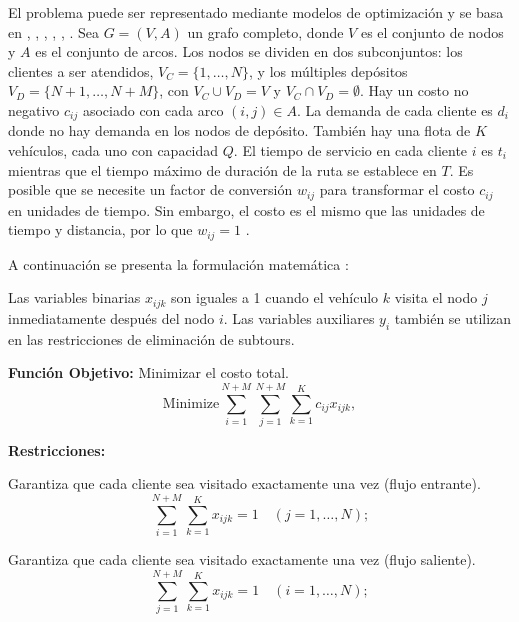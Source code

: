 El problema puede ser representado mediante modelos de optimización y se basa en  \parencite{montoya-torresLiteratureReviewVehicle2015}, \parencite{Cordeau2012}, \parencite{Vidal2012}, \parencite{Subramanian2013}, \parencite{Escobar2014}, \parencite{cordeauTabuSearchHeuristic1997}. Sea \(G = (V, A)\) un grafo completo, donde \(V\) es el conjunto de nodos y \(A\) es el conjunto de arcos. Los nodos se dividen en dos subconjuntos: los clientes a ser atendidos, \(V_{C} = \{1, \ldots, N\}\), y los múltiples depósitos \(V_{D} = \{N + 1, \ldots, N + M\}\), con \(V_{C} \cup V_{D} = V\) y \(V_{C} \cap V_{D} = \emptyset\). Hay un costo no negativo \(c_{ij}\) asociado con cada arco \((i, j) \in A\). La demanda de cada cliente es \(d_{i}\) donde no hay demanda en los nodos de depósito. También hay una flota de \(K\) vehículos, cada uno con capacidad \(Q\). El tiempo de servicio en cada cliente \(i\) es \(t_{i}\) mientras que el tiempo máximo de duración de la ruta se establece en \(T\). Es posible que se necesite un factor de conversión \(w_{ij}\) para transformar el costo \(c_{ij}\) en unidades de tiempo. Sin embargo, el costo es el mismo que las unidades de tiempo y distancia, por lo que \(w_{ij} = 1\)  \parencite{oliveiraCooperativeCoevolutionaryModels2015}.

A continuación se presenta la formulación matemática \parencite{oliveiraCooperativeCoevolutionaryModels2015}:

Las variables binarias \(x_{ijk}\) son iguales a 1 cuando el vehículo \(k\) visita el nodo \(j\) inmediatamente después del nodo \(i\). Las variables auxiliares \(y_{i}\) también se utilizan en las restricciones de eliminación de subtours.

\noindent\textbf{Función Objetivo:} Minimizar el costo total.
\begin{equation}
\mathrm{Minimize}\sum_{i = 1}^{N + M}\sum_{j = 1}^{N + M}\sum_{k = 1}^{K}c_{ij}x_{ijk},
\end{equation}

\noindent\textbf{Restricciones:}

Garantiza que cada cliente sea visitado exactamente una vez (flujo entrante).
\begin{equation}
\sum_{i = 1}^{N + M}\sum_{k = 1}^{K}x_{ijk} = 1 \quad (j = 1,\dots ,N);
\end{equation}

Garantiza que cada cliente sea visitado exactamente una vez (flujo saliente).
\begin{equation}
\sum_{j = 1}^{N + M}\sum_{k = 1}^{K}x_{ijk} = 1 \quad (i = 1,\dots ,N);
\end{equation}

